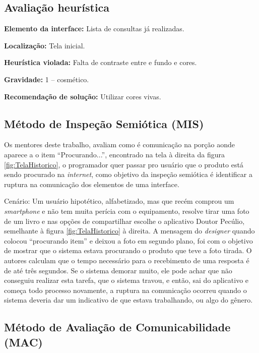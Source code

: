 \subsection{Avaliação heurística}

\par \noindent \textbf{Elemento da interface:} Lista de consultas já realizadas.
\par \noindent \textbf{Localização:} Tela inicial.
\par \noindent \textbf{Heurística violada:} Falta de contraste entre e fundo e cores.
\par \noindent \textbf{Gravidade:} 1 -- cosmético.
\par \noindent \textbf{Recomendação de solução:} Utilizar cores vivas.

\subsection{Método de Inspeção Semiótica (MIS)}

Os mentores deste trabalho, avaliam como é comunicação na porção aonde aparece a o item 
``Procurando...'', encontrado na tela à direita da
figura \ref{fig:TelaHistorico}, o programador quer passar pro usuário que o produto está sendo procurado 
na \emph{internet}, como objetivo da inspeção semiótica é identificar a ruptura na comunicação dos 
elementos de uma interface.

Cenário: Um usuário hipotético, alfabetizado, mas que recém comprou um 
\emph{smartphone} e não tem 
muita perícia com o equipamento, resolve tirar uma foto de um livro e nas opções de 
compartilhar escolhe o aplicativo Doutor Pecúlio, semelhante à 
figura \ref{fig:TelaHistorico} à direita. A mensagem 
do \emph{designer} quando colocou ``procurando item'' e deixou a foto em segundo plano, 
foi com o objetivo de
mostrar que o sistema estava procurando o produto que teve a foto tirada.
 O autores calculam que o tempo necessário para o recebimento
de uma resposta é de até três segundos.
Se o sistema demorar muito, ele pode achar que não conseguiu realizar esta tarefa, que o 
sistema travou, e então, sai do aplicativo e começa todo processo novamente, a ruptura na 
comunicação ocorreu quando o sistema deveria dar um indicativo de que estava trabalhando, 
ou algo do gênero.

\subsection{Método de Avaliação de Comunicabilidade (MAC)}

